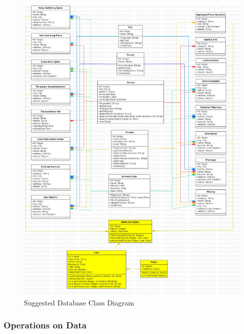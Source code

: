 \begin{figure}[H]
  \centering
  \includegraphics[width=\linewidth]{img/database-class-diagram-s5.jpg}
  \caption{Suggested Database Class Diagram}
\end{figure}

\subsubsection{Operations on Data}

